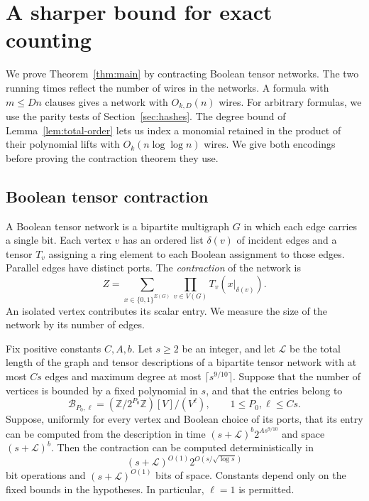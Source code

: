\section{A sharper bound for exact counting}\label{app:quantitative}

We prove Theorem~\ref{thm:main} by contracting Boolean tensor networks.
The two running times reflect the number of wires in the networks.
A formula with $m\le Dn$ clauses gives a network with $O_{k,D}(n)$
wires. For arbitrary formulas, we use the parity tests of
Section~\ref{sec:hashes}. The degree bound of Lemma~\ref{lem:total-order}
lets us index a monomial retained in the product of their polynomial
lifts with $O_k(n\log\log n)$ wires. We give both encodings before
proving the contraction theorem they use.

\subsection{Boolean tensor contraction}
\label{subsec:tensor-interface}

A Boolean tensor network is a bipartite multigraph $G$ in which each
edge carries a single bit. Each vertex $v$ has an ordered list
$\delta(v)$ of incident edges and a tensor $T_v$ assigning a ring
element to each Boolean assignment to those edges. Parallel edges
have distinct ports. The \emph{contraction} of the network is
\[
 Z=\sum_{x\in\{0,1\}^{E(G)}}\prod_{v\in V(G)} T_v(x|_{\delta(v)}).
\]
An isolated vertex contributes its scalar entry. We measure the size
of the network by its number of edges.

\begin{theorem}\label{thm:tensor-contraction}
Fix positive constants $C,A,b$.  Let $s\ge2$ be an integer, and let
$\mathcal L$ be the total length of the graph and tensor descriptions
of a bipartite tensor network with at most $Cs$ edges and maximum
degree at most $\lceil s^{9/10}\rceil$.  Suppose that the number of
vertices is bounded by a fixed polynomial in $s$, and that the entries
belong to
\[
 \mathcal B_{P_0,\ell}
   =(\mathbb Z/2^{P_0}\mathbb Z)[V]/(V^\ell),
 \qquad 1\le P_0,\ell\le Cs.
\]
Suppose, uniformly for every vertex and Boolean choice of its ports,
that its entry can be computed from the description in time
$(s+\mathcal L)^b2^{A s^{9/10}}$ and space $(s+\mathcal L)^b$.
Then the contraction can be computed deterministically in
\[
 (s+\mathcal L)^{O(1)}
  2^{O(s/\sqrt{\log s})}
\]
bit operations and $(s+\mathcal L)^{O(1)}$ bits of space.  Constants
depend only on the fixed bounds in the hypotheses.  In particular,
$\ell=1$ is permitted.
\end{theorem}

